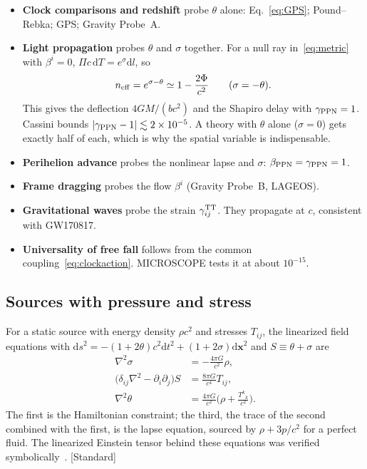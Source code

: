 \documentclass[11pt]{article}
\newcommand{\Pg}{\Pi}                 %
\newcommand{\thP}{\theta}             %
\newcommand{\sgP}{\sigma}             %
\newcommand{\dd}{\mathrm{d}}
\newcommand{\Tref}{T}                 %
\newcommand{\st}[1]{\textsf{\small[#1]}}
\theoremstyle{plain}
\theoremstyle{definition}
\theoremstyle{remark}
\begin{document}
\begin{itemize}
\item \textbf{Clock comparisons and redshift} probe $\thP$ alone: Eq.~\eqref{eq:GPS}; Pound--Rebka; GPS; Gravity Probe~A.
\item \textbf{Light propagation} probes $\thP$ and $\sgP$ together. For a null ray in~\eqref{eq:metric} with $\beta^i=0$, $\Pg c\,\dd\Tref=e^{\sgP}\dd l$, so
\begin{equation}
n_{\rm eff}=e^{\sgP-\thP}\simeq 1-\frac{2\Phi}{c^2}\qquad(\sgP=-\thP).
\end{equation}
This gives the deflection $4GM/(bc^2)$ and the Shapiro delay with $\gamma_{\rm PPN}=1$. Cassini bounds $|\gamma_{\rm PPN}-1|\lesssim 2\times10^{-5}$. A theory with $\thP$ alone ($\sgP=0$) gets exactly half of each, which is why the spatial variable is indispensable.
\item \textbf{Perihelion advance} probes the nonlinear lapse and $\sgP$: $\beta_{\rm PPN}=\gamma_{\rm PPN}=1$.
\item \textbf{Frame dragging} probes the flow $\beta^i$ (Gravity Probe~B, LAGEOS).
\item \textbf{Gravitational waves} probe the strain $\gamma_{ij}^{\rm TT}$. They propagate at $c$, consistent with GW170817.
\item \textbf{Universality of free fall} follows from the common coupling~\eqref{eq:clockaction}. MICROSCOPE tests it at about $10^{-15}$.
\end{itemize}

\subsection{Sources with pressure and stress}

For a static source with energy density $\rho c^2$ and stresses $T_{ij}$, the linearized field equations with $\dd s^2=-(1+2\thP)c^2\dd t^2+(1+2\sgP)\dd\mathbf x^2$ and $S\equiv\thP+\sgP$ are
\begin{align}
\nabla^2\sgP&=-\frac{4\pi G}{c^2}\rho, \label{eq:hamconstraint}\\
\big(\delta_{ij}\nabla^2-\partial_i\partial_j\big)S&=\frac{8\pi G}{c^4}T_{ij}, \label{eq:stresseq}\\
\nabla^2\thP&=\frac{4\pi G}{c^2}\Big(\rho+\frac{T^k{}_k}{c^2}\Big). \label{eq:lapseeq}
\end{align}
The first is the Hamiltonian constraint; the third, the trace of the second combined with the first, is the lapse equation, sourced by $\rho+3p/c^2$ for a perfect fluid. The linearized Einstein tensor behind these equations was verified symbolically~\cite{JordanNote2}. \st{Standard}
\end{document}

